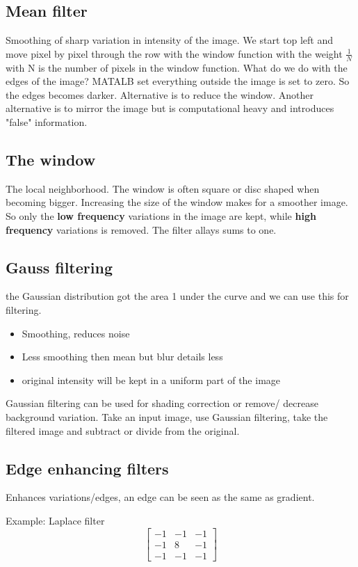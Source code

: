 \subsection*{Mean filter}
Smoothing of sharp variation in intensity of the image. We start top left and move pixel by pixel through the row with the window function with the weight $\frac{1} {N} $ with N is the number of pixels in the window function. 
What do we do with the edges of the image? MATALB set everything outside the image is set to zero. So the edges becomes darker. Alternative is to reduce the window. Another alternative is to mirror the image but is computational heavy and introduces "false" information.

\subsection*{The window}
The local neighborhood. The window is often square or disc shaped when becoming bigger. Increasing the size of the window makes for a smoother image. So only the \textbf{low frequency} variations in the image are kept, while \textbf{high frequency} variations is removed. The filter allays sums to one.

\subsection*{Gauss filtering}
the Gaussian distribution got the area 1 under the curve and we can use this for filtering. 
\begin{itemize}
	\item Smoothing, reduces noise
	\item Less smoothing then mean but blur details less
	\item original intensity will be kept in a uniform part of the image
\end{itemize}

Gaussian filtering can be used for shading correction or remove/ decrease background variation. Take an input image, use Gaussian filtering, take the filtered image and subtract or divide from the original. 

\subsection*{Edge enhancing filters}
Enhances variations/edges, an edge can be seen as the same as gradient. 

\begin{example}{Example: Laplace filter}
\begin{equation}
\begin{bmatrix} -1& -1& -1\\ -1& 8& -1 \\ -1& -1& -1 \end{bmatrix}
\end{equation}
\end{example}	

